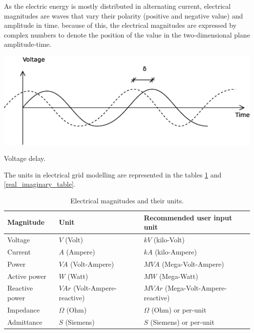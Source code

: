 \documentclass[a4paper,twoside]{tufte-book}
\begin{document}
As the electric energy is mostly distributed in alternating current, electrical magnitudes are waves that vary their polarity (positive and negative value) and amplitude in time. because of this, the electrical magnitudes are expressed by complex numbers to denote the position of the value in the two-dimensional plane amplitude-time. 

\begin{marginfigure}
  \includegraphics[width=\linewidth]{img/VoltageDelay.eps}
  \caption{Voltage delay.}
  \label{fig:vdelay}
\end{marginfigure}


The units in electrical grid modelling are represented in the tables \ref{units_table} and \ref{real_imaginary_table}.


\begin{table}[h]
\begin{center}
\footnotesize
\begin{tabular}{lll}
\toprule
Magnitude & Unit & Recommended user input unit\\
\midrule
Voltage & $V$ (Volt) & $kV$ (kilo-Volt)\\
Current & $A$ (Ampere) & $kA$ (kilo-Ampere)\\
Power & $VA$ (Volt-Ampere) & $MVA$ (Mega-Volt-Ampere)\\
Active power & $W$ (Watt) & $MW$ (Mega-Watt)\\
Reactive power & $VAr$ (Volt-Ampere-reactive) & $MVAr$ (Mega-Volt-Ampere-reactive)\\
Impedance & $\Omega$ (Ohm) & $\Omega$ (Ohm) or per-unit\\
Admittance & $S$ (Siemens) &  $S$ (Siemens) or per-unit\\
\bottomrule
\end{tabular}
\end{center}
  \caption{Electrical magnitudes and their units.}
  \label{units_table}
\end{table}
\end{document}
